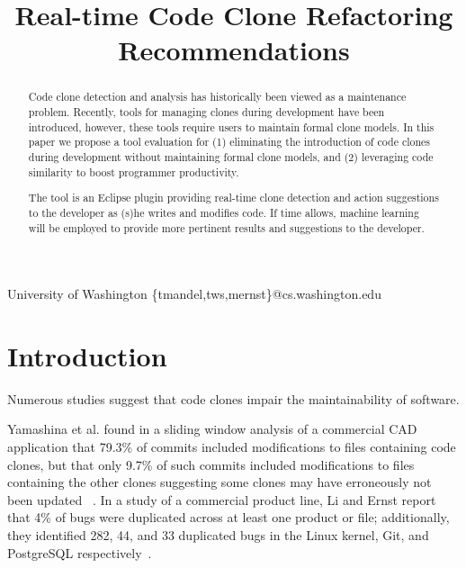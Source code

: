 \documentclass[preprint,10pt]{sigplanconf}
\begin{document}
%

\title{Real-time Code Clone Refactoring Recommendations}
           {University of Washington}
           {\{tmandel,tws,mernst\}@cs.washington.edu}

\maketitle
\begin{abstract}
Code clone detection and analysis has historically been viewed as a
maintenance problem. Recently, tools for managing clones during
development have been introduced, however, these tools require
users to maintain formal clone models.
In this paper we propose a tool evaluation for (1) eliminating the
introduction of code clones during development without maintaining formal clone models, and (2) leveraging code
similarity to boost programmer productivity.

The tool
is an Eclipse plugin providing real-time clone detection and action
suggestions to the developer as (s)he writes and modifies
code. If time allows, machine learning will be 
employed to provide more pertinent results
and suggestions to the developer.
\end{abstract}



\section{Introduction}
\label{sec:intro}
Numerous studies suggest that code clones impair the maintainability
of software.

Yamashina et al. found in a sliding window analysis of a commercial CAD
application that 79.3\% of commits included modifications to files
containing code clones, but that only 9.7\% of such commits included
modifications to files containing the other
clones suggesting some clones may have erroneously not been updated
~\cite{Yamashina2008}. 
In a study of a commercial product line, Li and Ernst report that 4\%
of bugs were duplicated across at least one product or file;
additionally, they identified 282, 44, and 33 duplicated bugs in the
Linux kernel, Git, and PostgreSQL respectively~\cite{LiE2011}.
\end{document}
